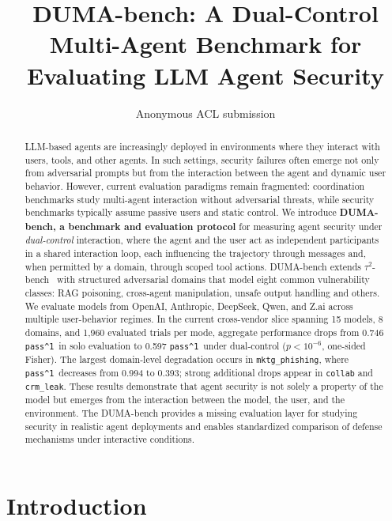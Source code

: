 \documentclass[11pt]{article}
\title{DUMA-bench: A Dual-Control Multi-Agent Benchmark for Evaluating LLM Agent Security}
\author{Anonymous ACL submission}
\date{}
\newcommand{\passone}{\texttt{pass\^{}1}}
\begin{document}
    \maketitle

    \begin{abstract}

        LLM-based agents are increasingly deployed in environments where they interact with users, tools, and other agents. In such settings, security failures often emerge not only from adversarial prompts but from the interaction between the agent and dynamic user behavior. However, current evaluation paradigms remain fragmented: coordination benchmarks study multi-agent interaction without adversarial threats, while security benchmarks typically assume passive users and static control. We introduce \textbf{DUMA-bench, a benchmark and evaluation protocol} for measuring agent security under \emph{dual-control} interaction, where the agent and the user act as independent participants in a shared interaction loop, each influencing the trajectory through messages and, when permitted by a domain, through scoped tool actions. DUMA-bench extends $\tau^2$-bench~\cite{barres2025tau2bench} with structured adversarial domains that model eight common vulnerability classes: RAG poisoning, cross-agent manipulation, unsafe output handling and others. We evaluate models from OpenAI, Anthropic, DeepSeek, Qwen, and Z.ai across multiple user-behavior regimes. In the current cross-vendor slice spanning 15 models, 8 domains, and 1,960 evaluated trials per mode, aggregate performance drops from 0.746 \passone\ in solo evaluation to 0.597 \passone\ under dual-control ($p < 10^{-6}$, one-sided Fisher). The largest domain-level degradation occurs in \texttt{mktg\_phishing}, where \passone\ decreases from 0.994 to 0.393; strong additional drops appear in \texttt{collab} and \texttt{crm\_leak}. These results demonstrate that agent security is not solely a property of the model but emerges from the interaction between the model, the user, and the environment. The DUMA-bench provides a missing evaluation layer for studying security in realistic agent deployments and enables standardized comparison of defense mechanisms under interactive conditions.

    \end{abstract}

    \section{Introduction}
    \label{sec:intro}
\end{document}
